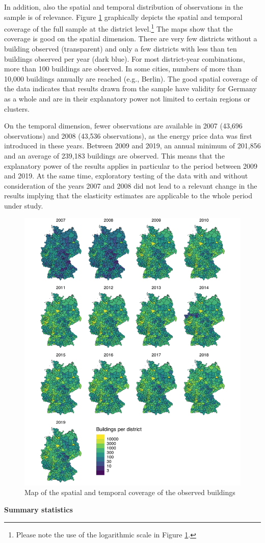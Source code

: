 \documentclass[12pt,twoside]{reedthesis}
\begin{document}
In addition, also the spatial and temporal distribution of observations in the sample is of relevance. Figure \ref{fig:buildings-distribution} graphically depicts the spatial and temporal coverage of the full sample at the district level.\footnote{Please note the use of the logarithmic scale in Figure \ref{fig:buildings-distribution}.} The maps show that the coverage is good on the spatial dimension. There are very few districts without a building observed (transparent) and only a few districts with less than ten buildings observed per year (dark blue). For most district-year combinations, more than 100 buildings are observed. In some cities, numbers of more than 10,000 buildings annually are reached (e.g., Berlin). The good spatial coverage of the data indicates that results drawn from the sample have validity for Germany as a whole and are in their explanatory power not limited to certain regions or clusters.

On the temporal dimension, fewer observations are available in 2007 (43,696 observations) and 2008 (43,536 observations), as the energy price data was first introduced in these years. Between 2009 and 2019, an annual minimum of 201,856 and an average of 239,183 buildings are observed. This means that the explanatory power of the results applies in particular to the period between 2009 and 2019. At the same time, exploratory testing of the data with and without consideration of the years 2007 and 2008 did not lead to a relevant change in the results implying that the elasticity estimates are applicable to the whole period under study.
\begin{figure}

{\centering \includegraphics[width=0.77\linewidth]{figure/buildings_distribution} 

}

\caption{Map of the spatial and temporal coverage of the observed buildings}\label{fig:buildings-distribution}
\end{figure}
\textbf{Summary statistics}
\end{document}
